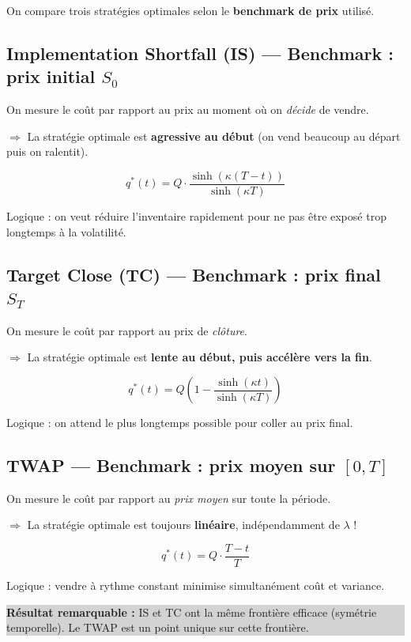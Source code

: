 \documentclass[12pt,a4paper]{article}
\begin{document}
On compare trois stratégies optimales selon le \textbf{benchmark de prix} utilisé.

\subsection{Implementation Shortfall (IS) — Benchmark : prix initial $S_0$}

On mesure le coût par rapport au prix au moment où on \emph{décide} de vendre.

$\Rightarrow$ La stratégie optimale est \textbf{agressive au début} (on vend beaucoup au départ puis on ralentit).

\[
q^*(t) = Q \cdot \frac{\sinh(\kappa(T-t))}{\sinh(\kappa T)}
\]

Logique : on veut réduire l'inventaire rapidement pour ne pas être exposé trop longtemps à la volatilité.

\subsection{Target Close (TC) — Benchmark : prix final $S_T$}

On mesure le coût par rapport au prix de \emph{clôture}.

$\Rightarrow$ La stratégie optimale est \textbf{lente au début, puis accélère vers la fin}.

\[
q^*(t) = Q\left(1 - \frac{\sinh(\kappa t)}{\sinh(\kappa T)}\right)
\]

Logique : on attend le plus longtemps possible pour coller au prix final.

\subsection{TWAP — Benchmark : prix moyen sur $[0,T]$}

On mesure le coût par rapport au \emph{prix moyen} sur toute la période.

$\Rightarrow$ La stratégie optimale est toujours \textbf{linéaire}, indépendamment de $\lambda$ !

\[
q^*(t) = Q \cdot \frac{T-t}{T}
\]

Logique : vendre à rythme constant minimise simultanément coût et variance.

\medskip
\colorbox{lightgray}{\parbox{\linewidth}{\small
\textbf{Résultat remarquable :} IS et TC ont la même frontière efficace (symétrie temporelle). Le TWAP est un point unique sur cette frontière.
}}
\end{document}
